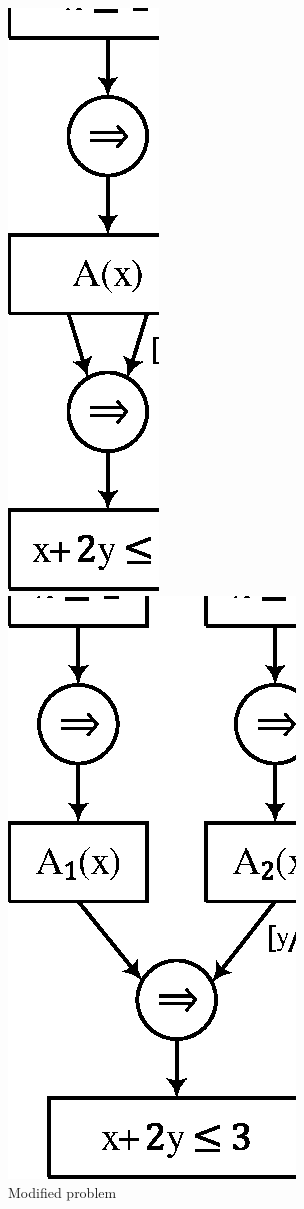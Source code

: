 \begin{figure}[htb]
  \begin{minipage}[t]{.47\textwidth}
  \centering
  \includegraphics[scale=0.8]{figures/ex2-2.eps}
  \caption{Modified problem}
  \label{fig:ex22}
  \end{minipage}
  \hfill
  \begin{minipage}[t]{.47\textwidth}
  \centering
  \includegraphics[scale=0.8]{figures/ex2-3.eps}

\end{minipage}
\end{figure}
